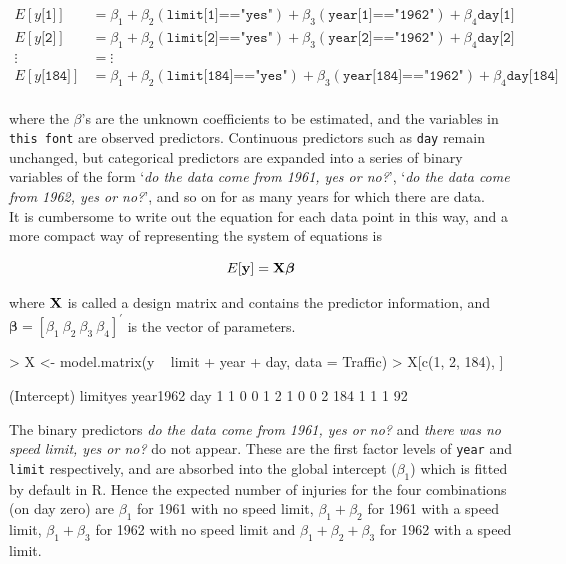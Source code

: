 \documentclass{article}
\begin{document}
\begin{displaymath}
\begin{array}{cl}
E[y\texttt{[1]}] &=\beta_{1}+\beta_{2}(\texttt{limit[1]=="yes"})+\beta_{3}(\texttt{year[1]=="1962"})+\beta_{4}\texttt{day[1]}\\
E[y\texttt{[2]}] &= \beta_{1}+\beta_{2}(\texttt{limit[2]=="yes"})+\beta_{3}(\texttt{year[2]=="1962"})+\beta_{4}\texttt{day[2]}\\
\vdots&=\vdots\\
E[y\texttt{[184]}] &= \beta_{1}+\beta_{2}(\texttt{limit[184]=="yes"})+\beta_{3}(\texttt{year[184]=="1962"})+\beta_{4}\texttt{day[184]}\\
\end{array}
\label{SE-eq}
\end{displaymath}

where the $\beta$'s are the unknown coefficients to be estimated, and the variables in \texttt{this font} are observed predictors. Continuous predictors such as \texttt{day} remain unchanged, but categorical predictors are expanded into a series of binary variables of the form `\emph{do the data come from 1961, yes or no?}', `\emph{do the data come from 1962, yes or no?}', and so on for as many years for which there are data.\\ 

It is cumbersome to write out the equation for each data point in this way, and a more compact way of representing the system of equations is

\begin{equation}
E[{\bf y}] = {\bf X}{\bm \beta}
\label{lm-eq}
\end{equation}	

where ${\bf X}$ is called a design matrix and contains the predictor information, and ${\bm \beta} = [\beta_{1}\ \beta_{2}\ \beta_{3}\ \beta_{4}]^{'}$ is the vector of parameters. 

\begin{Schunk}
\begin{Sinput}
> X <- model.matrix(y ~ limit + year + day, data = Traffic)
> X[c(1, 2, 184), ]
\end{Sinput}
\begin{Soutput}
    (Intercept) limityes year1962 day
1             1        0        0   1
2             1        0        0   2
184           1        1        1  92
\end{Soutput}
\end{Schunk}

The binary predictors \emph{do the data come from 1961, yes or no?} and \emph{there was no speed limit, yes or no?} do not appear. These are the first factor levels of \texttt{year} and \texttt{limit} respectively, and are absorbed into the global intercept ($\beta_{1}$) which is fitted by default in R.  Hence the expected number of injuries for the four combinations (on day zero) are $\beta_{1}$ for 1961 with no speed limit, $\beta_{1}+\beta_{2}$ for 1961 with a speed limit, $\beta_{1}+\beta_{3}$ for 1962 with no speed limit and  $\beta_{1}+\beta_{2}+\beta_{3}$ for 1962 with a speed limit.\\
\end{document}
